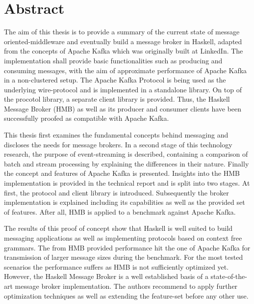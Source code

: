 \chapter{Abstract}

The aim of this thesis is to provide a summary of the current state of message
oriented-middleware and eventually build a message broker in Haskell, adapted
from the concepts of Apache Kafka which was originally built at LinkedIn. The
implementation shall provide basic functionalities such as producing and
consuming messages, with the aim of approximate performance of Apache Kafka
in a non-clustered setup. The Apache Kafka Protocol is being used as the
underlying wire-protocol and is implemented in a standalone library. On top of
the procotol library, a separate client library is provided. Thus, the Haskell
Message Broker (HMB) as well as its producer and consumer clients have been
successfully proofed as compatible with Apache Kafka.

This thesis first examines the fundamental concepts behind messaging and
discloses the needs for message brokers.  In a second stage of this
technology research, the purpose of event-streaming is described, containing a
comparison of batch and stream processing by explaining the
differences in their nature. Finally the concept and features of Apache
Kafka is presented.  Insights into the HMB implementation is provided in the
technical report and is split into two stages.  At first, the protocol
and client library is introduced. Subsequently the broker implementation
is explained including its capabilities as well as the provided
set of features. After all, HMB is applied to a benchmark against
Apache Kafka.

The results of this proof of concept show that Haskell is well suited to build
messaging applications as well as implementing protocols based on context free
grammars. The from HMB provided performance hit the one of Apache Kafka for
transmission of larger message sizes during the benchmark. For the most tested
scenarios the performance suffers as HMB is not sufficiently optimized yet.
However, the Haskell Message Broker is a well established basis of a
state-of-the-art message broker implementation. The authors recommend to apply
further optimization techniques as well as extending the feature-set before any
other use.
